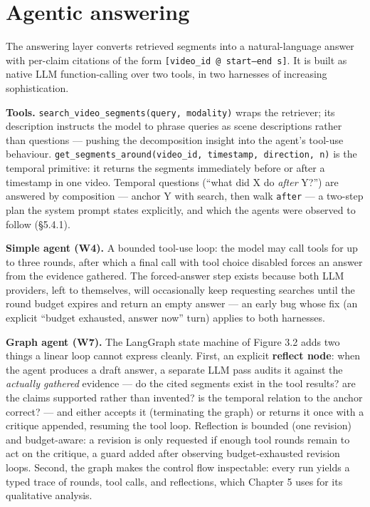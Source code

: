 \section{Agentic answering}

The answering layer converts retrieved segments into a natural-language
answer with per-claim citations of the form
\texttt{{[}video\_id\ @\ start–end\ s{]}}. It is built as native LLM
function-calling over two tools, in two harnesses of increasing
sophistication.

\textbf{Tools.} \texttt{search\_video\_segments(query,\ modality)} wraps
the retriever; its description instructs the model to phrase queries as
scene descriptions rather than questions --- pushing the decomposition
insight into the agent's tool-use behaviour.
\texttt{get\_segments\_around(video\_id,\ timestamp,\ direction,\ n)} is
the temporal primitive: it returns the segments immediately before or
after a timestamp in one video. Temporal questions (``what did X do
\emph{after} Y?'') are answered by composition --- anchor Y with search,
then walk \texttt{after} --- a two-step plan the system prompt states
explicitly, and which the agents were observed to follow (§5.4.1).

\textbf{Simple agent (W4).} A bounded tool-use loop: the model may call
tools for up to three rounds, after which a final call with tool choice
disabled forces an answer from the evidence gathered. The forced-answer
step exists because both LLM providers, left to themselves, will
occasionally keep requesting searches until the round budget expires and
return an empty answer --- an early bug whose fix (an explicit ``budget
exhausted, answer now'' turn) applies to both harnesses.

\textbf{Graph agent (W7).} The LangGraph state machine of Figure 3.2
adds two things a linear loop cannot express cleanly. First, an explicit
\textbf{reflect node}: when the agent produces a draft answer, a
separate LLM pass audits it against the \emph{actually gathered}
evidence --- do the cited segments exist in the tool results? are the
claims supported rather than invented? is the temporal relation to the
anchor correct? --- and either accepts it (terminating the graph) or
returns it once with a critique appended, resuming the tool loop.
Reflection is bounded (one revision) and budget-aware: a revision is
only requested if enough tool rounds remain to act on the critique, a
guard added after observing budget-exhausted revision loops. Second, the
graph makes the control flow inspectable: every run yields a typed trace
of rounds, tool calls, and reflections, which Chapter 5 uses for its
qualitative analysis.


